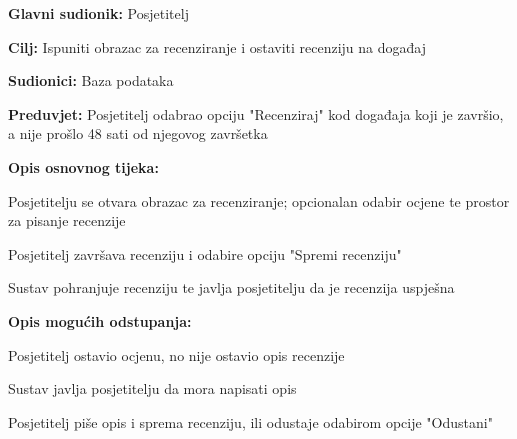 					\noindent {}
\begin{packed_item}
	\item \textbf{Glavni sudionik:} Posjetitelj
	\item  \textbf{Cilj:} Ispuniti obrazac za recenziranje i ostaviti recenziju na događaj
	\item  \textbf{Sudionici:} Baza podataka
	\item  \textbf{Preduvjet:} Posjetitelj odabrao opciju "Recenziraj" kod događaja koji je završio, a nije prošlo 48 sati od njegovog završetka
	\item  \textbf{Opis osnovnog tijeka:}
	
	\item[] \begin{packed_enum}
		
		\item Posjetitelju se otvara obrazac za recenziranje; opcionalan odabir ocjene te prostor za pisanje recenzije
		\item Posjetitelj završava recenziju i odabire opciju "Spremi recenziju"
		\item Sustav pohranjuje recenziju te javlja posjetitelju da je recenzija uspješna
	\end{packed_enum}
	
	\item  \textbf{Opis mogućih odstupanja:}
	
	\item[] \begin{packed_item}
		
		\item[2.a] Posjetitelj ostavio ocjenu, no nije ostavio opis recenzije
		\item[] \begin{packed_enum}
			
			\item Sustav javlja posjetitelju da mora napisati opis
			\item Posjetitelj piše opis i sprema recenziju, ili odustaje odabirom opcije "Odustani"
			
		\end{packed_enum}
		
	\end{packed_item}
\end{packed_item}

